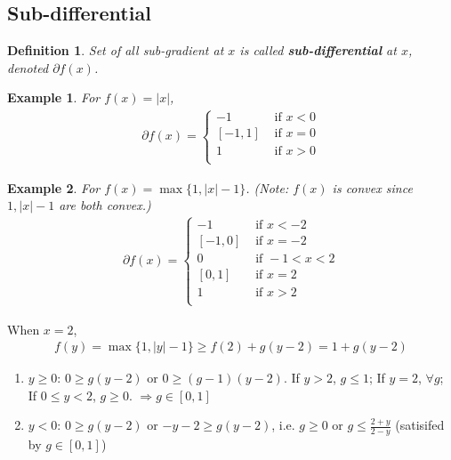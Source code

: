\documentclass[11pt,a4paper]{article}
\newtheorem{example}{Example}
\newtheorem{definition}{Definition}
\begin{document}
\subsection{Sub-differential}
\begin{definition}
    Set of all sub-gradient at $x$ is called \textbf{sub-differential} at $x$, denoted $\partial f(x)$.
\end{definition}
\begin{example}
For $f(x)=|x|$,
\begin{equation}
    \begin{aligned}
        \partial f(x)=\left\{\begin{matrix}
            -1&\text{ if }x<0\\
            [-1,1]&\text{ if }x=0\\
            1&\text{ if }x>0\\
        \end{matrix}\right.
    \end{aligned}
    \nonumber
\end{equation}
\end{example}

\begin{example}
For $f(x)=\max\{1,|x|-1\}$. (Note: $f(x)$ is convex since $1,|x|-1$ are both convex.)
\begin{equation}
    \begin{aligned}
        \partial f(x)=\left\{\begin{matrix}
            -1&\text{ if }x<-2\\
            [-1,0]&\text{ if }x=-2\\
            0&\text{ if }-1<x<2\\
            [0,1]&\text{ if }x=2\\
            1&\text{ if }x>2\\
        \end{matrix}\right.
    \end{aligned}
    \nonumber
\end{equation}
\end{example}
When $x=2$,
\begin{equation}
    \begin{aligned}
        f(y)=\max\{1,|y|-1\}\geq f(2)+g(y-2)=1+g(y-2)
    \end{aligned}
    \nonumber
\end{equation}
\begin{enumerate}[(1)]
    \item \underline{$y\geq 0$}: $0\geq g(y-2)$ or $0\geq (g-1)(y-2)$. If $y>2$, $g\leq 1$; If $y=2$, $\forall g$; If $0\leq y< 2$, $g\geq 0$. $\Rightarrow g\in[0,1]$
    \item \underline{$y< 0$}: $0\geq g(y-2)$ or $-y-2\geq g(y-2)$, i.e. $g\geq 0$ or $g\leq \frac{2+y}{2-y}$ (satisifed by $g\in[0,1]$)
\end{enumerate}
\end{document}
